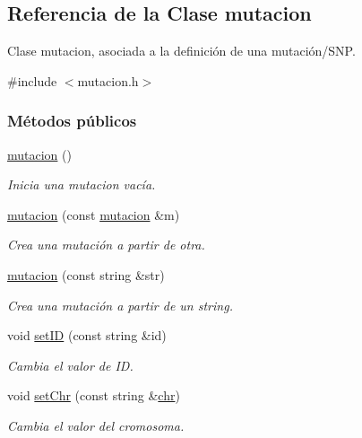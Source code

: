 \hypertarget{classmutacion}{\subsection{Referencia de la Clase mutacion}
\label{classmutacion}
}


Clase mutacion, asociada a la definición de una mutación/\-S\-N\-P.  




{\ttfamily \#include $<$mutacion.\-h$>$}

\subsubsection*{Métodos públicos}
\begin{DoxyCompactItemize}
\item 
\hyperlink{classmutacion_a01cb8b2307eacbfb415f99373ff3c64a}{mutacion} ()
\begin{DoxyCompactList}\small\item\em Inicia una mutacion vacía. \end{DoxyCompactList}\item 
\hyperlink{classmutacion_a6bcb17c723a359ffac7dda8d5d427dfe}{mutacion} (const \hyperlink{classmutacion}{mutacion} \&m)
\begin{DoxyCompactList}\small\item\em Crea una mutación a partir de otra. \end{DoxyCompactList}\item 
\hyperlink{classmutacion_a8c5cc5b5146c511b9a1d6976156389c3}{mutacion} (const string \&str)
\begin{DoxyCompactList}\small\item\em Crea una mutación a partir de un string. \end{DoxyCompactList}\item 
void \hyperlink{classmutacion_af6288453d3cb4e29b8be304ca262b170}{set\-I\-D} (const string \&id)
\begin{DoxyCompactList}\small\item\em Cambia el valor de I\-D. \end{DoxyCompactList}\item 
void \hyperlink{classmutacion_a147ee1f35c78ab0b7cf891067bf2e336}{set\-Chr} (const string \&\hyperlink{classmutacion_a57651966b952f782240ff9cff72c5d2f}{chr})
\begin{DoxyCompactList}\small\item\em Cambia el valor del cromosoma. \end{DoxyCompactList}\item 

\end{DoxyCompactItemize}
